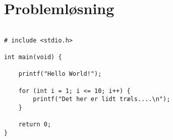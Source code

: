 \chapter{Problemløsning}\label{ch:ch3label}


\begin{verbatim}

# include <stdio.h>

int main(void) {
    
    printf("Hello World!");
    
    for (int i = 1; i <= 10; i++) {
        printf("Det her er lidt træls....\n");
    }
    
    return 0;
}
\end{verbatim}